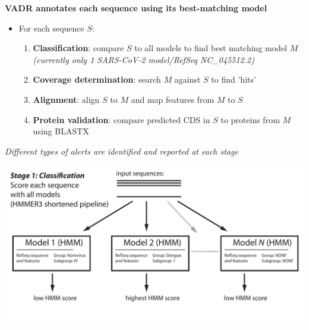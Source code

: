 \documentclass[landscape]{slides}
\begin{document}
\begin{slide}
\begin{center}
\textbf{VADR annotates each sequence using its best-matching model}

\begin{itemize}
\item For each sequence $S$:
\small
\begin{enumerate}
\item \textbf{Classification}: compare $S$ to all models to find best
  matching model $M$ \\ \emph{(currently only 1 SARS-CoV-2
    model/RefSeq NC\_045512.2)}
\item \textbf{Coverage determination}: search $M$ against $S$ to find 'hits'
\item \textbf{Alignment}: align $S$ to $M$ and map features from $M$ to $S$
\item \textbf{Protein validation}: compare predicted CDS in $S$ to proteins
  from $M$ using BLASTX
\end{enumerate}
\end{itemize}

\emph{Different types of alerts are identified and reported at each stage}

\end{center}

\vfill
\end{slide}
\begin{slide}
\begin{center}

\includegraphics[width=9.5in]{figs/v-annotate-stage1-1}

\end{center}
\vfill
\end{slide}
\end{document}
